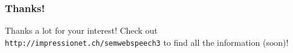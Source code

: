 \documentclass[handout]{beamer}
\begin{document}
       \begin{frame}
           \frametitle{Thanks!}
           \vskip 0.7cm
           \huge
           Thanks a lot for your interest!
           \normalsize
           \vskip 0.7cm
           Check out 
           \vskip 0.5cm
           \texttt{http://impressionet.ch/semwebspeech3}
           \vskip 0.5cm
           to find all the information (soon)!
       \end{frame}
\end{document}
